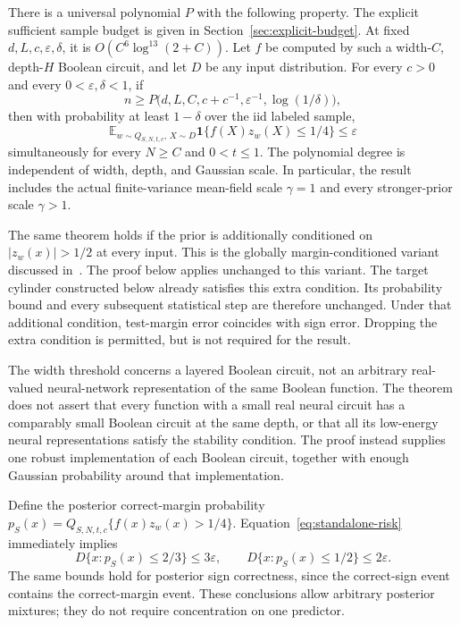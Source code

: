 \begin{theorem}
\label{thm:standalone-clipped}
There is a universal polynomial $P$ with the following property.
The explicit sufficient sample budget is given in
Section~\ref{sec:explicit-budget}. At fixed $d,L,c,\varepsilon,\delta$,
it is $O(C^6\log^{13}(2+C))$. Let $f$
be computed by such a width-$C$, depth-$H$ Boolean circuit, and let $D$ be
any input distribution. For every $c>0$ and every $0<\varepsilon,\delta<1$, if
\[
 n\ge P\bigl(d,L,C,c+c^{-1},\varepsilon^{-1},\log(1/\delta)\bigr),
\]
then with probability at least $1-\delta$ over the iid labeled sample,
\begin{equation}\label{eq:standalone-risk}
 \mathbb E_{w\sim Q_{S,N,t,c},\,X\sim D}
       \mathbf1\{f(X)z_w(X)\le1/4\}\le\varepsilon
\end{equation}
simultaneously for every $N\ge C$ and $0<t\le1$.
The polynomial degree is independent of width, depth, and Gaussian scale.
In particular, the result includes the actual finite-variance mean-field
scale $\gamma=1$ and every stronger-prior scale $\gamma>1$.
\end{theorem}

The same theorem holds if the prior is additionally conditioned on
$|z_w(x)|>1/2$ at every input. This is the globally margin-conditioned
variant discussed in~\cite{earlier}. The proof below applies unchanged to
this variant. The target cylinder constructed below already satisfies this extra
condition. Its probability bound and every subsequent statistical step are
therefore unchanged. Under that additional condition, test-margin error
coincides with sign error. Dropping the extra condition is permitted, but is
not required for the result.

The width threshold concerns a layered Boolean circuit, not an arbitrary
real-valued neural-network representation of the same Boolean function.
The theorem does not assert that every function with a small real neural
circuit has a comparably small Boolean circuit at the same depth, or that
all its low-energy neural representations satisfy the stability condition.
The proof instead supplies one robust implementation of each Boolean
circuit, together with enough Gaussian probability around that implementation.

Define the posterior correct-margin probability
$p_S(x)=Q_{S,N,t,c}\{f(x)z_w(x)>1/4\}$.
Equation~\eqref{eq:standalone-risk} immediately implies
\[
 D\{x:p_S(x)\le2/3\}\le3\varepsilon,
 \qquad D\{x:p_S(x)\le1/2\}\le2\varepsilon.
\]
The same bounds hold for posterior sign correctness, since the correct-sign
event contains the correct-margin event. These conclusions allow arbitrary
posterior mixtures; they do not require concentration on one predictor.

